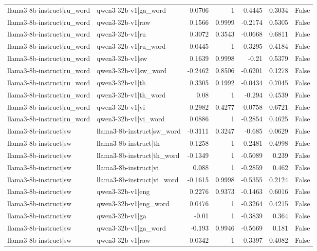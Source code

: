 \begin{table}
\begin{tabular}{l l r r r r l}
llama3-8b-instruct|ru_word & qwen3-32b-v1|ga_word & -0.0706 & 1 & -0.4445 & 0.3034 & False \\
llama3-8b-instruct|ru_word & qwen3-32b-v1|raw & 0.1566 & 0.9999 & -0.2174 & 0.5305 & False \\
llama3-8b-instruct|ru_word & qwen3-32b-v1|ru & 0.3072 & 0.3543 & -0.0668 & 0.6811 & False \\
llama3-8b-instruct|ru_word & qwen3-32b-v1|ru_word & 0.0445 & 1 & -0.3295 & 0.4184 & False \\
llama3-8b-instruct|ru_word & qwen3-32b-v1|sw & 0.1639 & 0.9998 & -0.21 & 0.5379 & False \\
llama3-8b-instruct|ru_word & qwen3-32b-v1|sw_word & -0.2462 & 0.8506 & -0.6201 & 0.1278 & False \\
llama3-8b-instruct|ru_word & qwen3-32b-v1|th & 0.3305 & 0.1992 & -0.0434 & 0.7045 & False \\
llama3-8b-instruct|ru_word & qwen3-32b-v1|th_word & 0.08 & 1 & -0.294 & 0.4539 & False \\
llama3-8b-instruct|ru_word & qwen3-32b-v1|vi & 0.2982 & 0.4277 & -0.0758 & 0.6721 & False \\
llama3-8b-instruct|ru_word & qwen3-32b-v1|vi_word & 0.0886 & 1 & -0.2854 & 0.4625 & False \\
llama3-8b-instruct|sw & llama3-8b-instruct|sw_word & -0.3111 & 0.3247 & -0.685 & 0.0629 & False \\
llama3-8b-instruct|sw & llama3-8b-instruct|th & 0.1258 & 1 & -0.2481 & 0.4998 & False \\
llama3-8b-instruct|sw & llama3-8b-instruct|th_word & -0.1349 & 1 & -0.5089 & 0.239 & False \\
llama3-8b-instruct|sw & llama3-8b-instruct|vi & 0.088 & 1 & -0.2859 & 0.462 & False \\
llama3-8b-instruct|sw & llama3-8b-instruct|vi_word & -0.1615 & 0.9998 & -0.5355 & 0.2124 & False \\
llama3-8b-instruct|sw & qwen3-32b-v1|eng & 0.2276 & 0.9373 & -0.1463 & 0.6016 & False \\
llama3-8b-instruct|sw & qwen3-32b-v1|eng_word & 0.0476 & 1 & -0.3264 & 0.4215 & False \\
llama3-8b-instruct|sw & qwen3-32b-v1|ga & -0.01 & 1 & -0.3839 & 0.364 & False \\
llama3-8b-instruct|sw & qwen3-32b-v1|ga_word & -0.193 & 0.9946 & -0.5669 & 0.181 & False \\
llama3-8b-instruct|sw & qwen3-32b-v1|raw & 0.0342 & 1 & -0.3397 & 0.4082 & False \\

\end{tabular}
\end{table}
